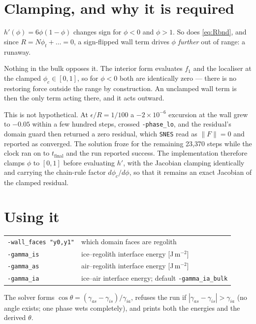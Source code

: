 \documentclass[11pt,a4paper]{article}
\newcommand{\code}[1]{\texttt{\small #1}}
\newcommand{\sia}{\gamma_{ia}}
\newcommand{\sis}{\gamma_{is}}
\newcommand{\sas}{\gamma_{as}}
\newcommand{\eps}{\epsilon}
\begin{document}
\section{Clamping, and why it is required}

$h'(\phi)=6\phi(1-\phi)$ changes sign for $\phi<0$ and $\phi>1$. So does
\eqref{eq:Rbnd}, and since $R=N\phi_t+\dots=0$, a sign-flipped wall term drives
$\phi$ \emph{further} out of range: a runaway.

Nothing in the bulk opposes it. The interior form evaluates $f_1$ and the
localiser at the clamped $\phi_c\in[0,1]$, so for $\phi<0$ both are identically
zero --- there is no restoring force outside the range by construction. An
unclamped wall term is then the only term acting there, and it acts outward.

This is not hypothetical. At $\eps/R=1/100$ a $-2\times10^{-6}$ excursion at the
wall grew to $-0.05$ within a few hundred steps, crossed \code{-phase\_lo}, and
the residual's domain guard then returned a zero residual, which \code{SNES} read
as $\|F\|=0$ and reported as converged. The solution froze for the remaining
23{,}370 steps while the clock ran on to $t_{\text{final}}$ and the run reported
success. The implementation therefore clamps $\phi$ to $[0,1]$ before evaluating
$h'$, with the Jacobian clamping identically and carrying the chain-rule factor
$d\phi_c/d\phi$, so that it remains an exact Jacobian of the clamped residual.

\section{Using it}

\begin{center}\begin{tabular}{@{}ll@{}}
\toprule
\code{-wall\_faces "y0,y1"} & which domain faces are regolith \\
\code{-gamma\_is} & ice--regolith interface energy [J\,m$^{-2}$] \\
\code{-gamma\_as} & air--regolith interface energy [J\,m$^{-2}$] \\
\code{-gamma\_ia} & ice--air interface energy; default \code{-gamma\_ia\_bulk} \\
\bottomrule
\end{tabular}\end{center}

The solver forms $\cos\theta=(\sas-\sis)/\sia$, refuses the run if
$|\sas-\sis|>\sia$ (no angle exists; one phase wets completely), and prints both
the energies and the derived $\theta$.
\end{document}
